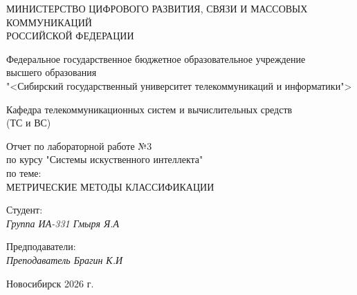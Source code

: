 \thispagestyle{empty}

\begin{center}
    МИНИСТЕРСТВО ЦИФРОВОГО РАЗВИТИЯ, СВЯЗИ И МАССОВЫХ КОММУНИКАЦИЙ \\ РОССИЙСКОЙ ФЕДЕРАЦИИ

    \vspace{20pt}

    Федеральное государственное бюджетное образовательное учреждение  \\  высшего образования \\
    "<Сибирский государственный университет телекоммуникаций и информатики"> \\

    \vspace{20pt}

    Кафедра телекоммуникационных систем и вычислительных средств \\  (ТС и ВС)
\end{center}

\vfill

\begin{center}
    Отчет по лабораторной работе №3 \\  
    по курсу "Системы искуственного интеллекта" \\
    \vspace{20pt}
    по теме: \\
    \uppercase{МЕТРИЧЕСКИЕ МЕТОДЫ
КЛАССИФИКАЦИИ}
\end{center}

\vfill

    \noindent Студент: \\
    \textit{Группа ИА-331 \hfill Гмыря Я.А} 

    \vspace{20pt}
 
    \noindent Предподаватели: \\
    \textit{Преподаватель \hfill Брагин К.И} \\
\vfill

\begin{center}
    Новосибирск 2026 г.
\end{center}